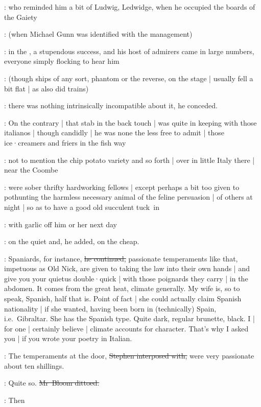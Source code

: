 :
who reminded him a bit of Ludwig,
 Ledwidge,
when he occupied the boards of the Gaiety%

:
(when Michael Gunn was identified with the management)

:
in the ,
a stupendous success,
and his host of admirers came in large numbers,
everyone simply flocking to hear him

:
(though ships of any sort,
phantom or the reverse,
on the stage |
usually fell a bit flat |
as also did trains)

:
there was nothing intrinsically incompatible about it,
he conceded.

:
On the contrary |
that stab in the back touch |
was quite in keeping with those italianos |
though candidly |
he was none the less free to admit |
those ice·creamers and friers in the fish way

:
not to mention the chip potato variety and so forth |
over in little Italy there |
near the Coombe

:
were sober thrifty hardworking fellows |
except perhaps a bit too given
to pothunting the harmless necessary animal of the feline persuasion |
of others at night |
so as to have a good old succulent tuck~in

:
with garlic 
off him or her next day

:
on the quiet and,
he added,
on the cheap.

\Bloom:
Spaniards,
for instance,
\sout{he continued,}
passionate temperaments like that,
impetuous as Old Nick,
are given to taking the law into their own hands |
and give you your quietus double·quick |
with those poignards they carry |
in the abdomen.
It comes from the great heat,
climate generally.
My wife is,
so to speak,
Spanish,
half that is.
Point of fact |
she could actually claim Spanish nationality |
if she wanted,
having been born in (technically) Spain,
i.e.\ Gibraltar.
She has the Spanish type.
Quite dark,
regular brunette,
black.
I |
for one |
certainly believe |
climate accounts for character.
That's why I asked you |
if you wrote your poetry in Italian.

\Stephen:
The temperaments at the door,
\sout{Stephen interposed with,}
were very passionate about ten shillings.

\Bloom:
Quite so.
\sout{Mr~Bloom dittoed.}

\Stephen:
Then

